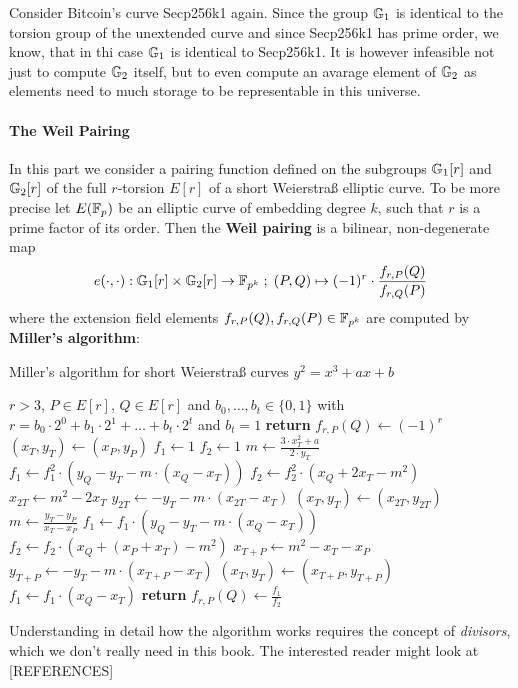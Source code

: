 \begin{example}Consider Bitcoin's curve Secp256k1 again. Since the group $\mathbb{G}_1$ is identical to the torsion group of the unextended curve and since Secp256k1 has prime order, we know, that in thi case $\mathbb{G}_1$ is identical to Secp256k1. It is however infeasible not just to compute $\mathbb{G}_2$ itself, but to even compute an avarage element of $\mathbb{G}_2$ as elements need to much storage to be representable in this universe.
\end{example}
\paragraph{The Weil Pairing} In this part we consider a pairing function defined on
the subgroups $\mathbb{G}_1[r]$ and $\mathbb{G}_2[r]$ of the full $r$-torsion $E[r]$ of a short Weierstraß elliptic curve. To be more precise let $E(\mathbb{F}_p)$ be an elliptic curve of embedding degree $k$, such that $r$ is a prime factor of its order. Then the \textbf{Weil pairing} is a bilinear, non-degenerate map
\begin{equation}
e(\cdot,\cdot) : \mathbb{G}_1[r] \times \mathbb{G}_2[r] \to \mathbb{F}_{p^k}\; ;\;
(P,Q)\mapsto (-1)^r \cdot \frac{f_{r,P}(Q)}{f_{r,Q}(P)}
\end{equation}
where the extension field elements $f_{r,P}(Q), f_{r,Q}(P)\in \mathbb{F}_{p^k}$ are computed by \textbf{Miller's algorithm}:
\begin{algorithm}\caption{Miller's algorithm for short Weierstraß curves $y^2 = x^3 +ax +b$}
\label{alg_projective_group_law}
\begin{algorithmic}[0]
\Require $r>3$, $P \in E[r]$, $Q\in E[r]$ and
\State $b_0,\ldots, b_t\in \{0,1\}$ with $r= b_0\cdot 2^0 + b_1\cdot 2^1 + \ldots + b_t\cdot 2^t$ and $b_t=1$
	\State \textbf{return} $f_{r,P}(Q) \gets (-1)^r$
\EndIf
\State $(x_T,y_T) \gets (x_P,y_P)$
\State $f_1\gets 1$
\State $f_2\gets 1$
	\State $m \gets \frac{3\cdot x_T^2+a}{2\cdot y_T}$
    \State $f_1 \gets f_1^2\cdot (y_Q - y_T - m\cdot(x_Q-x_T))$
	\State $f_2 \gets f_2^2\cdot (x_Q + 2x_T -m^2)$
	\State $x_{2T} \gets m^2 - 2 x_T$
	\State $y_{2T} \gets -y_T - m\cdot (x_{2T}-x_T)$
	\State $(x_T,y_T)\gets (x_{2T},y_{2T})$
		\State $m \gets \frac{y_T -y_P}{x_T - x_P}$
		\State $f_1 \gets f_1\cdot (y_Q -y_T -m\cdot (x_Q - x_T))$
		\State $f_2 \gets f_2\cdot (x_Q + (x_P+x_T) - m^2)$
		\State $x_{T+P} \gets m^2 -x_T -x_P$
		\State $y_{T+P}\gets -y_T - m\cdot (x_{T+P}-x_T)$
		\State $(x_T,y_T)\gets (x_{T+P},y_{T+P})$
	\EndIf
\EndFor
\State $f_1 \gets f_1\cdot (x_Q - x_T)$
\State \textbf{return} $f_{r,P}(Q) \gets \frac{f_1}{f_2}$
\EndProcedure
\end{algorithmic}
\end{algorithm}
Understanding in detail how the algorithm works requires the concept of \textit{divisors}, which we don't really need in this book. The interested reader might look at [REFERENCES]

